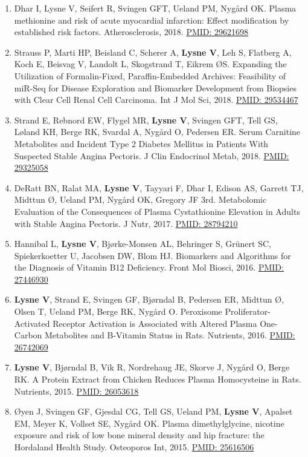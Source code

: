 \documentclass[11pt, a4paper]{awesome-cv}
\begin{document}
\begin{enumerate}
\item
  Dhar I, Lysne V, Seifert R, Svingen GFT, Ueland PM, Nygård OK. Plasma methionine and risk of acute myocardial infarction: Effect modification by established risk factors. Atherosclerosis, 2018. \href{https://www.ncbi.nlm.nih.gov/pubmed/29621698}{PMID: 29621698}
\item
  Strauss P, Marti HP, Beisland C, Scherer A, \textbf{Lysne V}, Leh S, Flatberg A, Koch E, Beisvag V, Landolt L, Skogstrand T, Eikrem ØS. Expanding the Utilization of Formalin-Fixed, Paraffin-Embedded Archives: Feasibility of miR-Seq for Disease Exploration and Biomarker Development from Biopsies with Clear Cell Renal Cell Carcinoma. Int J Mol Sci, 2018. \href{https://www.ncbi.nlm.nih.gov/pubmed/29534467}{PMID: 29534467}
\item
  Strand E, Rebnord EW, Flygel MR, \textbf{Lysne V}, Svingen GFT, Tell GS, Løland KH, Berge RK, Svardal A, Nygård O, Pedersen ER. Serum Carnitine Metabolites and Incident Type 2 Diabetes Mellitus in Patients With Suspected Stable Angina Pectoris. J Clin Endocrinol Metab, 2018. \href{https://www.ncbi.nlm.nih.gov/pubmed/29325058}{PMID: 29325058}
\item
  DeRatt BN, Ralat MA, \textbf{Lysne V}, Tayyari F, Dhar I, Edison AS, Garrett TJ, Midttun Ø, Ueland PM, Nygård OK, Gregory JF 3rd. Metabolomic Evaluation of the Consequences of Plasma Cystathionine Elevation in Adults with Stable Angina Pectoris. J Nutr, 2017. \href{https://www.ncbi.nlm.nih.gov/pubmed/28794210}{PMID: 28794210}
\item
  Hannibal L, \textbf{Lysne V}, Bjørke-Monsen AL, Behringer S, Grünert SC, Spiekerkoetter U, Jacobsen DW, Blom HJ. Biomarkers and Algorithms for the Diagnosis of Vitamin B12 Deficiency. Front Mol Biosci, 2016. \href{https://www.ncbi.nlm.nih.gov/pubmed/}{PMID: 27446930}
\item
  \textbf{Lysne V}, Strand E, Svingen GF, Bjørndal B, Pedersen ER, Midttun Ø, Olsen T, Ueland PM, Berge RK, Nygård O. Peroxisome Proliferator-Activated Receptor Activation is Associated with Altered Plasma One-Carbon Metabolites and B-Vitamin Status in Rats. Nutrients, 2016. \href{https://www.ncbi.nlm.nih.gov/pubmed/26742069}{PMID: 26742069}
\item
  \textbf{Lysne V}, Bjørndal B, Vik R, Nordrehaug JE, Skorve J, Nygård O, Berge RK. A Protein Extract from Chicken Reduces Plasma Homocysteine in Rats. Nutrients, 2015. \href{https://www.ncbi.nlm.nih.gov/pubmed/26053618}{PMID: 26053618}
\item
  Øyen J, Svingen GF, Gjesdal CG, Tell GS, Ueland PM, \textbf{Lysne V}, Apalset EM, Meyer K, Vollset SE, Nygård OK. Plasma dimethylglycine, nicotine exposure and risk of low bone mineral density and hip fracture: the Hordaland Health Study. Osteoporos Int, 2015. \href{https://www.ncbi.nlm.nih.gov/pubmed/25616506}{PMID: 25616506}
\end{enumerate}
\end{document}
